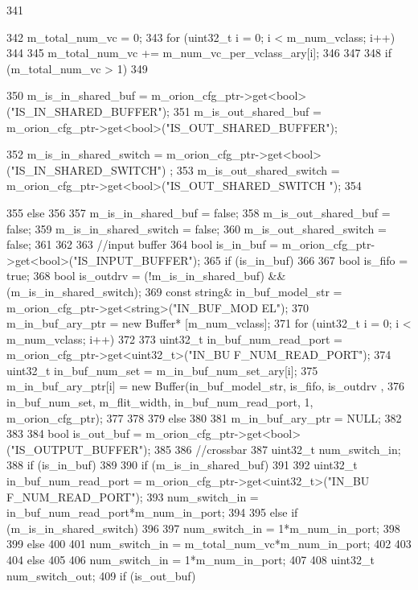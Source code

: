 \begin{DoxyCode}
341 {
342     m_total_num_vc = 0;
343     for (uint32_t i = 0; i < m_num_vclass; i++)
344     {
345         m_total_num_vc += m_num_vc_per_vclass_ary[i];
346     }
347 
348     if (m_total_num_vc > 1)
349     {
350         m_is_in_shared_buf = m_orion_cfg_ptr->get<bool>("IS_IN_SHARED_BUFFER");
351         m_is_out_shared_buf = m_orion_cfg_ptr->get<bool>("IS_OUT_SHARED_BUFFER");
      
352         m_is_in_shared_switch = m_orion_cfg_ptr->get<bool>("IS_IN_SHARED_SWITCH")
      ;
353         m_is_out_shared_switch = m_orion_cfg_ptr->get<bool>("IS_OUT_SHARED_SWITCH
      ");
354     }
355     else
356     {
357         m_is_in_shared_buf = false;
358         m_is_out_shared_buf = false;
359         m_is_in_shared_switch = false;
360         m_is_out_shared_switch = false;
361     }
362 
363     //input buffer
364     bool is_in_buf = m_orion_cfg_ptr->get<bool>("IS_INPUT_BUFFER");
365     if (is_in_buf)
366     {
367         bool is_fifo = true;
368         bool is_outdrv = (!m_is_in_shared_buf) && (m_is_in_shared_switch);
369         const string& in_buf_model_str = m_orion_cfg_ptr->get<string>("IN_BUF_MOD
      EL");
370         m_in_buf_ary_ptr = new Buffer* [m_num_vclass];
371         for (uint32_t i = 0; i < m_num_vclass; i++)
372         {
373             uint32_t in_buf_num_read_port = m_orion_cfg_ptr->get<uint32_t>("IN_BU
      F_NUM_READ_PORT");
374             uint32_t in_buf_num_set = m_in_buf_num_set_ary[i];
375             m_in_buf_ary_ptr[i] = new Buffer(in_buf_model_str, is_fifo, is_outdrv
      , 
376                     in_buf_num_set, m_flit_width, in_buf_num_read_port, 1, 
      m_orion_cfg_ptr);
377         }
378     }
379     else
380     {
381         m_in_buf_ary_ptr = NULL;
382     }
383 
384     bool is_out_buf = m_orion_cfg_ptr->get<bool>("IS_OUTPUT_BUFFER");
385 
386     //crossbar
387     uint32_t num_switch_in;
388     if (is_in_buf)
389     {
390         if (m_is_in_shared_buf)
391         {
392             uint32_t in_buf_num_read_port = m_orion_cfg_ptr->get<uint32_t>("IN_BU
      F_NUM_READ_PORT");
393             num_switch_in = in_buf_num_read_port*m_num_in_port;
394         }
395         else if (m_is_in_shared_switch)
396         {
397             num_switch_in = 1*m_num_in_port;
398         }
399         else
400         {
401             num_switch_in = m_total_num_vc*m_num_in_port;
402         }
403     }
404     else
405     {
406         num_switch_in = 1*m_num_in_port;
407     }
408     uint32_t num_switch_out;
409     if (is_out_buf)
}
\end{DoxyCode}
